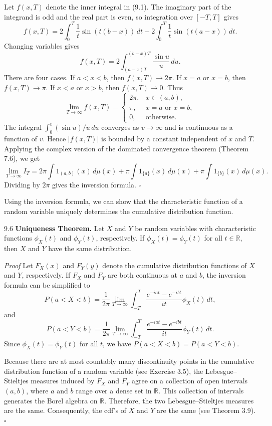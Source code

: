 Let $f(x,T)$ denote the inner integral in (9.1). The imaginary part of the integrand is odd and the real part is even, so integration over $[-T,T]$ gives
\[
f(x,T)
=2\int_0^T \frac{1}{t}\sin(t(b-x))\,dt
-2\int_0^T \frac{1}{t}\sin(t(a-x))\,dt.
\]
Changing variables gives
\[
f(x,T)
=2\int_{(a-x)T}^{(b-x)T}\frac{\sin u}{u}\,du.
\]
There are four cases. If $a<x<b$, then $f(x,T)\to 2\pi$. If $x=a$ or $x=b$, then $f(x,T)\to \pi$. If $x<a$ or $x>b$, then $f(x,T)\to 0$. Thus
\[
\lim_{T\to\infty} f(x,T)=
\begin{cases}
2\pi, & x\in(a,b),\\
\pi, & x=a\text{ or }x=b,\\
0, & \text{otherwise}.
\end{cases}
\]
The integral $\int_0^v (\sin u)/u\,du$ converges as $v\to\infty$ and is continuous as a function of $v$. Hence $\lvert f(x,T)\rvert$ is bounded by a constant independent of $x$ and $T$. Applying the complex version of the dominated convergence theorem (Theorem 7.6), we get
\[
\lim_{T\to\infty} I_T
=2\pi\int 1_{(a,b)}(x)\,d\mu(x)
+\pi\int 1_{\{a\}}(x)\,d\mu(x)
+\pi\int 1_{\{b\}}(x)\,d\mu(x).
\]
Dividing by $2\pi$ gives the inversion formula.
\hfill $\square$

Using the inversion formula, we can show that the characteristic function of a random variable uniquely determines the cumulative distribution function.

\begin{thmbox}{9.6}
\textbf{Uniqueness Theorem.}
Let $X$ and $Y$ be random variables with characteristic functions $\phi_X(t)$ and $\phi_Y(t)$, respectively. If $\phi_X(t)=\phi_Y(t)$ for all $t\in\mathbb{R}$, then $X$ and $Y$ have the same distribution.
\end{thmbox}

\textit{Proof}
Let $F_X(x)$ and $F_Y(y)$ denote the cumulative distribution functions of $X$ and $Y$, respectively. If $F_X$ and $F_Y$ are both continuous at $a$ and $b$, the inversion formula can be simplified to
\[
P(a<X<b)
=\frac{1}{2\pi}\lim_{T\to\infty}\int_{-T}^{T}
\frac{e^{-iat}-e^{-ibt}}{it}\phi_X(t)\,dt,
\]
and
\[
P(a<Y<b)
=\frac{1}{2\pi}\lim_{T\to\infty}\int_{-T}^{T}
\frac{e^{-iat}-e^{-ibt}}{it}\phi_Y(t)\,dt.
\]
Since $\phi_X(t)=\phi_Y(t)$ for all $t$, we have $P(a<X<b)=P(a<Y<b)$.

Because there are at most countably many discontinuity points in the cumulative distribution function of a random variable (see Exercise 3.5), the Lebesgue--Stieltjes measures induced by $F_X$ and $F_Y$ agree on a collection of open intervals $(a,b)$, where $a$ and $b$ range over a dense set in $\mathbb{R}$. This collection of intervals generates the Borel algebra on $\mathbb{R}$. Therefore, the two Lebesgue--Stieltjes measures are the same. Consequently, the cdf's of $X$ and $Y$ are the same (see Theorem 3.9).
\hfill $\square$

